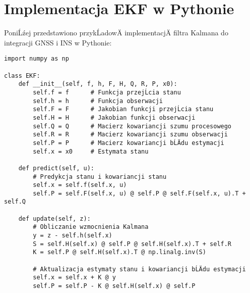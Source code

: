 \chapter{Implementacja EKF w Pythonie}

PoniĹźej przedstawiono przykĹadowÄ implementacjÄ filtra Kalmana do integracji GNSS i INS w Pythonie:

\begin{lstlisting}[caption={Implementacja EKF w Pythonie}, label={lst:EKF_Python}]
import numpy as np

class EKF:
    def __init__(self, f, h, F, H, Q, R, P, x0):
        self.f = f      # Funkcja przejĹcia stanu
        self.h = h      # Funkcja obserwacji
        self.F = F      # Jakobian funkcji przejĹcia stanu
        self.H = H      # Jakobian funkcji obserwacji
        self.Q = Q      # Macierz kowariancji szumu procesowego
        self.R = R      # Macierz kowariancji szumu obserwacji
        self.P = P      # Macierz kowariancji bĹÄdu estymacji
        self.x = x0     # Estymata stanu

    def predict(self, u):
        # Predykcja stanu i kowariancji stanu
        self.x = self.f(self.x, u)
        self.P = self.F(self.x, u) @ self.P @ self.F(self.x, u).T + self.Q

    def update(self, z):
        # Obliczanie wzmocnienia Kalmana
        y = z - self.h(self.x)
        S = self.H(self.x) @ self.P @ self.H(self.x).T + self.R
        K = self.P @ self.H(self.x).T @ np.linalg.inv(S)

        # Aktualizacja estymaty stanu i kowariancji bĹÄdu estymacji
        self.x = self.x + K @ y
        self.P = self.P - K @ self.H(self.x) @ self.P
\end{lstlisting}

